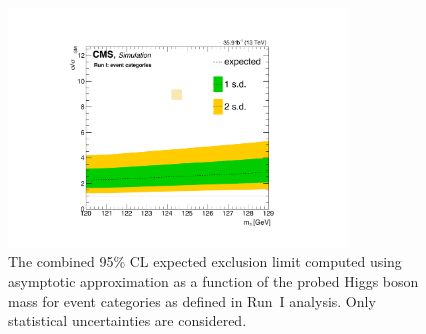 \begin{figure}[hbp]
     \centering
      \includegraphics[width=0.8\textwidth]{figures/combine/limitsAsymptotic/baseline_110to160_p25GeV_NoNuis_Viktor/runIcat_b.pdf}
     \caption{The combined 95\% CL expected exclusion limit computed using asymptotic approximation as a function of the probed Higgs boson mass for event categories as defined in Run~I analysis. Only statistical uncertainties are considered.}
     \label{combine:LimitsAsymptotic}
 \end{figure}
